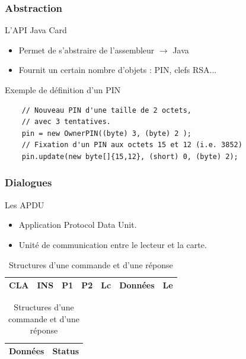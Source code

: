 \documentclass{beamer}
\begin{document}
\begin{frame}[fragile]
    \frametitle{Abstraction}
    \begin{block}{L'API Java Card}
        \begin{itemize}
            \item Permet de s'abstraire de l'assembleur $\rightarrow$ Java
            \item Fournit un certain nombre d'objets : PIN, clefs RSA...
        \end{itemize}
    \end{block}
    \begin{exampleblock}{Exemple de définition d'un PIN}
    
        \begin{lstlisting}
    // Nouveau PIN d'une taille de 2 octets, 
    // avec 3 tentatives.
    pin = new OwnerPIN((byte) 3, (byte) 2 );
    // Fixation d'un PIN aux octets 15 et 12 (i.e. 3852)
    pin.update(new byte[]{15,12}, (short) 0, (byte) 2);
        \end{lstlisting}
    \end{exampleblock}
\end{frame}

\begin{frame}
    \frametitle{Dialogues}
    \begin{block}{Les APDU}
        \begin{itemize}
            \item Application Protocol Data Unit.
            \item Unité de communication entre le lecteur et la carte.
        \end{itemize}
    \end{block}
    \begin{table}
        \begin{tabular}{|c|c|c|c|c|c|c|}
            \hline
            CLA & INS & P1 & P2 & Lc & Données & Le\\
            \hline
        \end{tabular}
        \newline
        \begin{tabular}{|c|c|}
            \hline
            Données & Status\\
            \hline
        \end{tabular}
        \caption{Structures d'une commande et d'une réponse}
    \end{table}
\end{frame}
\end{document}
